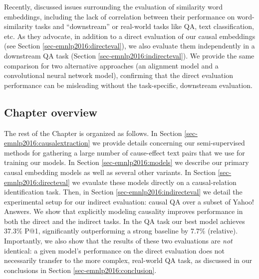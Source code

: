 Recently, \citet{faruqui2016problems} discussed issues surrounding the evaluation of similarity word embeddings, including the lack of correlation between their performance on word-similarity tasks and ``downstream'' or real-world tasks like QA, text classification, etc.  As they advocate, in addition to a direct evaluation of our causal embeddings (see Section \ref{sec-emnlp2016:directeval}), we also evaluate them independently in a downstream QA task (Section \ref{sec-emnlp2016:indirecteval}).  We provide the same comparison for two alternative approaches (an alignment model and a convolutional neural network model), confirming that the direct evaluation performance can be misleading without the task-specific, downstream evaluation.

\subsection{Chapter overview}

The rest of the Chapter is organized as follows.  
In Section \ref{sec-emnlp2016:causalextraction} we provide details concerning our semi-supervised methods for gathering a large number of cause-effect text pairs that we use for training our models.  In Section \ref{sec-emnlp2016:models} we describe our primary causal embedding models as well as several other variants.  In Section \ref{sec-emnlp2016:directeval} we evaulate these models directly on a causal-relation identification task.  Then, in Section \ref{sec-emnlp2016:indirecteval} we detail the experimental setup for our indirect evaluation: causal QA over a subset of Yahoo! Answers.  We show that explicitly modeling causality improves performance in both the direct and the indirect tasks. In the QA task our best model achieves 37.3\% P@1, significantly outperforming a strong baseline by 7.7\% (relative).
Importantly, we also show that the results of these two evaluations are \emph{not} identical: a given model's performance on the direct evaluation does not necessarily transfer to the more complex, real-world QA task, as discussed in our conclusions in Section \ref{sec-emnlp2016:conclusion}.


